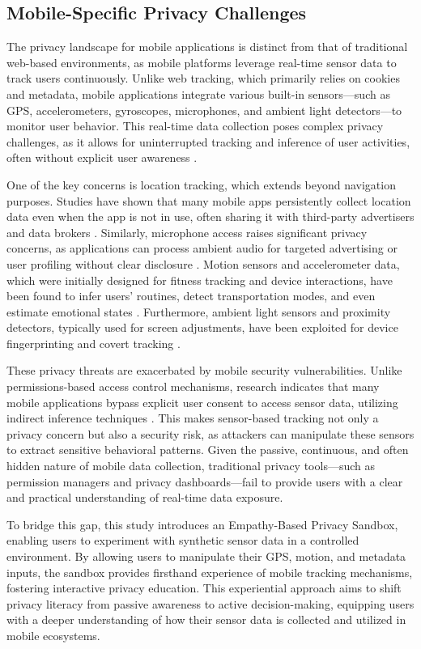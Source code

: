 \documentclass[acmlarge, nonacm]{acmart}
\begin{document}
\subsection{Mobile-Specific Privacy Challenges}
The privacy landscape for mobile applications is distinct from that of traditional web-based environments, as mobile platforms leverage real-time sensor data to track users continuously. Unlike web tracking, which primarily relies on cookies and metadata, mobile applications integrate various built-in sensors—such as GPS, accelerometers, gyroscopes, microphones, and ambient light detectors—to monitor user behavior. This real-time data collection poses complex privacy challenges, as it allows for uninterrupted tracking and inference of user activities, often without explicit user awareness \cite{CAHAR}.

One of the key concerns is location tracking, which extends beyond navigation purposes. Studies have shown that many mobile apps persistently collect location data even when the app is not in use, often sharing it with third-party advertisers and data brokers \cite{bian2021supply}. Similarly, microphone access raises significant privacy concerns, as applications can process ambient audio for targeted advertising or user profiling without clear disclosure \cite{pudasaini2024comprehensive}. Motion sensors and accelerometer data, which were initially designed for fitness tracking and device interactions, have been found to infer users’ routines, detect transportation modes, and even estimate emotional states \cite{niemeijer2023promise}. Furthermore, ambient light sensors and proximity detectors, typically used for screen adjustments, have been exploited for device fingerprinting and covert tracking \cite{berdich2023survey}.

These privacy threats are exacerbated by mobile security vulnerabilities. Unlike permissions-based access control mechanisms, research indicates that many mobile applications bypass explicit user consent to access sensor data, utilizing indirect inference techniques \cite{aburas2024user}. This makes sensor-based tracking not only a privacy concern but also a security risk, as attackers can manipulate these sensors to extract sensitive behavioral patterns. Given the passive, continuous, and often hidden nature of mobile data collection, traditional privacy tools—such as permission managers and privacy dashboards—fail to provide users with a clear and practical understanding of real-time data exposure.

To bridge this gap, this study introduces an Empathy-Based Privacy Sandbox, enabling users to experiment with synthetic sensor data in a controlled environment. By allowing users to manipulate their GPS, motion, and metadata inputs, the sandbox provides firsthand experience of mobile tracking mechanisms, fostering interactive privacy education. This experiential approach aims to shift privacy literacy from passive awareness to active decision-making, equipping users with a deeper understanding of how their sensor data is collected and utilized in mobile ecosystems.
\end{document}
